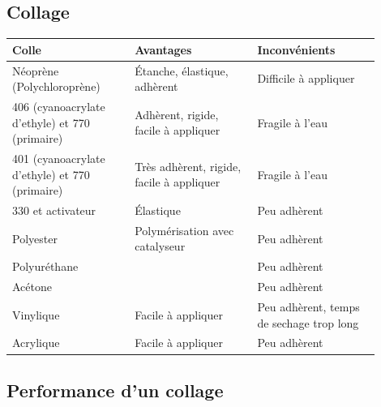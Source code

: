 \subsection{Collage}

\begin{frame}
	\begin{tabular}{|p{0.3\linewidth}|p{0.3\linewidth}|p{0.3\linewidth}|}
		\hline
		Colle & Avantages & Inconvénients \\
		\hline

		\rowcolor{OrangeT}
		Néoprène (Polychloroprène) &
		Étanche, élastique, adhèrent &
		Difficile à appliquer \\
		\hline

		\rowcolor{OrangeT}
		406 (cyanoacrylate d'ethyle) et 770 (primaire) &
		Adhèrent, rigide, facile à appliquer &
		Fragile à l'eau \\
		\hline

		\rowcolor{GreenT}
		401 (cyanoacrylate d'ethyle) et 770 (primaire) &
		Très adhèrent, rigide, facile à appliquer &
		Fragile à l'eau \\
		\hline

		\rowcolor{RedT}
		330 et activateur &
		Élastique &
		Peu adhèrent \\
		\hline

		\rowcolor{RedT}
		Polyester &
		Polymérisation avec catalyseur &
		Peu adhèrent \\
		\hline
		
		\rowcolor{RedT}
		Polyuréthane &
		& Peu adhèrent \\
		\hline

		\rowcolor{RedT}
		Acétone &
		& Peu adhèrent \\
		\hline
		
		\rowcolor{RedT}
		Vinylique &
		Facile à appliquer &
		Peu adhèrent, temps de sechage trop long \\
		\hline

		\rowcolor{RedT}
		Acrylique &
		Facile à appliquer &
		Peu adhèrent \\
		\hline

	\end{tabular}
\end{frame}

\subsection{Performance d'un collage}

